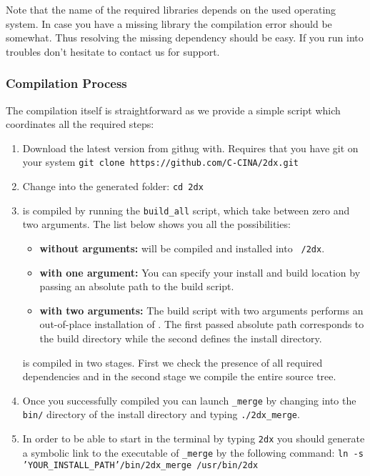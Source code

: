 Note that the name of the required libraries depends on the used operating system. In case you have a missing library the compilation error should be somewhat. Thus resolving the missing dependency should be easy. If you run into troubles don't hesitate to contact us for support.


\subsubsection{Compilation Process}
The compilation itself is straightforward as we provide a simple script which coordinates all the required steps:

\begin{enumerate}
	\item Download the latest version from githug with. Requires that you have git on your system
	\newline
	\texttt{git clone https://github.com/C-CINA/2dx.git}
	
	\item Change into the generated folder:
		\newline 
	\texttt{cd 2dx}

	\item {\twodx} is compiled by running the \texttt{build\_all} script, which take between zero and two arguments. The list below shows you all the possibilities:
	\begin{itemize}
		\item \textbf{without arguments:} {\twodx} will be compiled and installed into \texttt{~/2dx}.
		\item \textbf{with one argument:} You can specify your install and build location by passing an absolute path to the build script.
		\item \textbf{with two arguments:} The build script with two arguments performs an out-of-place installation of {\twodx}. The first passed absolute path corresponds to the build directory while the second defines the install directory.  
	\end{itemize}
	
	{\twodx} is compiled in two stages. First we check the presence of all required dependencies and in the second stage we compile the entire source tree.
	
	\item Once you successfully compiled {\twodx} you can launch {\twodx}\texttt{\_merge} by changing into the \texttt{bin/} directory of the install directory and typing \texttt{./2dx\_merge}.
	
	\item In order to be able to start {\twodx} in the terminal by typing \texttt{2dx} you should generate a symbolic link to the executable of {\twodx}\texttt{\_merge} by the following command:\newline
	\texttt{ln -s 'YOUR\_INSTALL\_PATH'/bin/2dx\_merge /usr/bin/2dx}
	
\end{enumerate}




